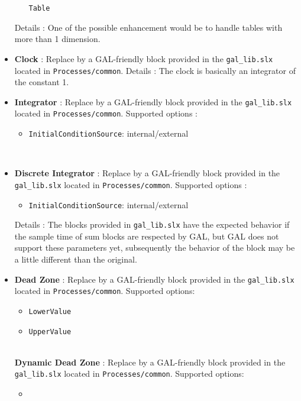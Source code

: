 \documentclass[a4paper,12pt]{article}
\begin{document}
\begin{itemize}
\begin{itemize}
	\texttt{Table}
	\end{itemize}
Details : One of the possible enhancement would be to handle tables with more than 1 dimension.
~\\
\item
\textbf{Clock} : Replace by a GAL-friendly block provided in the \texttt{gal\_lib.slx} located in \texttt{Processes/common}. \newline
Details : The clock is basically an integrator of the constant 1.
~\\
\item
\textbf{Integrator} : Replace by a GAL-friendly block provided in the \texttt{gal\_lib.slx} located in \texttt{Processes/common}. \newline
	Supported options :
	\begin{itemize}
	\item
	\texttt{InitialConditionSource}: internal/external
	\end{itemize}
	~
\item
\textbf{Discrete Integrator} : Replace by a GAL-friendly block provided in the \texttt{gal\_lib.slx} located in \texttt{Processes/common}. \newline
	Supported options :
	\begin{itemize}
	\item
	\texttt{InitialConditionSource}: internal/external
	\end{itemize}
Details : The blocks provided in \texttt{gal\_lib.slx} have the expected behavior if the sample time of sum blocks are respected by GAL, but GAL does not support these parameters yet, subsequently the behavior of the block may be a little different than the original.
~\\
\item
\textbf{Dead Zone} : Replace by a GAL-friendly block provided in the \texttt{gal\_lib.slx} located in \texttt{Processes/common}. \newline
	Supported options: 
	\begin{itemize}
	\item
	\texttt{LowerValue}
	\item
	\texttt{UpperValue}
	\end{itemize}
	~\\
\textbf{Dynamic Dead Zone} : Replace by a GAL-friendly block provided in the \texttt{gal\_lib.slx} located in \texttt{Processes/common}. \newline
	Supported options: 
	\begin{itemize}
	\item

\end{itemize}
\end{itemize}
\end{document}
